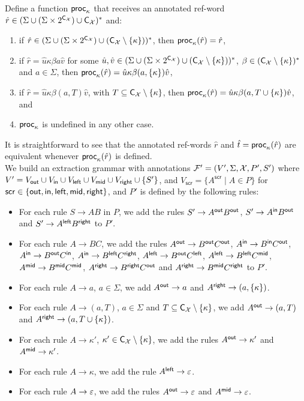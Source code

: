 Define a function $\mathsf{proc}_{\kappa}$ that receives an annotated ref-word
$\hat{r}\in (\Sigma \cup (\Sigma\times2^{\textsf{C}_{\mathcal{X}}}) \cup
\textsf{C}_{\mathcal{X}})^*$ and:
\begin{enumerate}
  \item if $\hat{r}\in (\Sigma \cup (\Sigma\times2^{\textsf{C}_{\mathcal{X}}}) \cup (\textsf{C}_{\mathcal{X}}\setminus\{\kappa\}))^*$, then $\mathsf{proc}_{\kappa}(\hat{r}) = \hat{r}$,
  \item if $\hat{r} = \hat{u}\kappa \beta a\hat{v}$ for some $\hat{u}, \hat{v}\in (\Sigma \cup (\Sigma\times2^{\textsf{C}_{\mathcal{X}}}) \cup (\textsf{C}_{\mathcal{X}}\setminus\{\kappa\}))^*$, $\beta\in (\textsf{C}_{\mathcal{X}}\setminus\{\kappa\})^*$ and $a\in\Sigma$, then $\mathsf{proc}_{\kappa}(\hat{r}) = \hat{u}\kappa \beta (a,\{\kappa\})\hat{v}$,
  \item if $\hat{r} = \hat{u}\kappa \beta (a,T)\hat{v}$, with $T\subseteq\textsf{C}_{\mathcal{X}}\setminus\{\kappa\}$, then  $\mathsf{proc}_{\kappa}(\hat{r}) = \hat{u}\kappa \beta (a,T\cup\{\kappa\})\hat{v}$, and
  \item $\mathsf{proc}_{\kappa}$ is undefined in any other case.
\end{enumerate}
It is straightforward to see that the annotated ref-words $\hat{r}$ and $\hat{t} = \mathsf{proc}_\kappa(\hat{r})$ are equivalent whenever $\mathsf{proc}_\kappa(\hat{r})$ is defined.\\


We build an extraction grammar with annotations $\mathcal{F}' = (V', \Sigma, \mathcal{X}, P', S')$ where $V' = V_{\mathsf{out}} \cup V_{\mathsf{in}} \cup V_{\mathsf{left}} \cup V_{\mathsf{mid}} \cup V_{\mathsf{right}}\cup\{S'\}$, and $V_\mathsf{scr} = \{A^\mathsf{scr} \mid A\in P\}$ for $\mathsf{scr}\in\{\mathsf{out}, \mathsf{in}, \mathsf{left}, \mathsf{mid}, \mathsf{right}\}$, and $P'$ is defined by the following rules:
\begin{itemize}
	\item For each rule $S\to AB$ in $P$, we add the rules $S'\to A^{\mathsf{out}}B^{\mathsf{out}}$, $S'\to A^{\mathsf{in}}B^{\mathsf{out}}$ and $S'\to A^{\mathsf{left}}B^{\mathsf{right}}$ to $P'$.
	\item For each rule $A\to BC$, we add the rules $A^{\mathsf{out}} \to B^{\mathsf{out}}C^{\mathsf{out}}$, $A^{\mathsf{in}}\to B^{\mathsf{in}}C^{\mathsf{out}}$, $A^{\mathsf{in}}\to B^{\mathsf{out}}C^{\mathsf{in}}$, $A^{\mathsf{in}}\to B^{\mathsf{left}}C^{\mathsf{right}}$, $A^{\mathsf{left}}\to B^{\mathsf{out}}C^{\mathsf{left}}$, $A^{\mathsf{left}}\to B^{\mathsf{left}}C^{\mathsf{mid}}$, $A^{\mathsf{mid}}\to B^{\mathsf{mid}}C^{\mathsf{mid}}$, $A^{\mathsf{right}}\to B^{\mathsf{right}}C^{\mathsf{out}}$ and $A^{\mathsf{right}}\to B^{\mathsf{mid}}C^{\mathsf{right}}$ to $P'$.
	\item For each rule $A\to a$, $a\in \Sigma$, we add $A^{\mathsf{out}}\to a$ and $A^{\mathsf{right}}\to(a, \{\kappa\})$.
\item For each rule $A\to (a, T)$, $a\in \Sigma$ and $T\subseteq\textsf{C}_{\mathcal{X}}\setminus\{\kappa\}$, we add $A^{\mathsf{out}}\to (a, T)$ and $A^{\mathsf{right}}\to(a, T\cup\{\kappa\})$.
\item For each rule $A\to \kappa'$, $\kappa'\in\textsf{C}_{\mathcal{X}}\setminus\{\kappa\}$, we add the rules $A^{\mathsf{out}}\to\kappa'$ and $A^{\mathsf{mid}}\to\kappa'$.
\item For each rule $A\to \kappa$, we add the rule $A^{\mathsf{left}}\to\varepsilon$.
\item For each rule $A\to\varepsilon$, we add the rules $A^{\mathsf{out}}\to\varepsilon$ and $A^{\mathsf{mid}}\to\varepsilon$.
\end{itemize}

